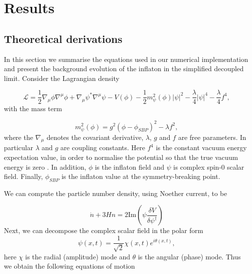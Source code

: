 \section{Results}

\subsection{Theoretical derivations}
In this section we summarise the equations used in our numerical implementation and present the background evolution of the inflaton in the simplified decoupled limit. Consider the Lagrangian density \cite{Apostolos}

\begin{equation}
    \mathcal{L} = \frac{1}{2} \nabla_{\mu} \phi \nabla^{\mu} \phi + \nabla_{\mu} \psi^* \nabla^{\mu} \psi - V(\phi) - \frac{1}{2} m_{\psi}^2(\phi) |\psi|^2 - \frac{\lambda}{4} |\psi|^4 - \frac{\lambda}{4}f^4,
\end{equation}
with the mass term

\begin{equation}
    m_{\psi}^2(\phi) = g^2 (\phi - \phi_{SBP})^2 - \lambda f^2,
\end{equation}
where the $\nabla_{\mu}$ denotes the covariant derivative, $\lambda$, $g$ and $f$ are free parameters. In particular $\lambda$ and $g$ are coupling constants. Here $f^4$ is the constant vacuum energy expectation value, in order to normalise the potential so that the true vacuum energy is zero \cite{dimopoulos2019quintessential}. In addition, $\phi$ is the inflaton field and $\psi$ is complex spin-0 scalar field. Finally, $\phi_{SBP}$ is the inflaton value at the symmetry-breaking point. 




We can compute the particle number density, using Noether current, to be

\begin{equation}
    \dot{n} + 3H n = 2 \mathrm{Im} \left( \psi \frac{\delta V}{\delta \psi^{\dag}} \right)
\end{equation}
Next, we can decompose the complex scalar field in the polar form
\begin{equation}
    \psi(x,t) = \frac{1}{\sqrt{2}} \chi(x,t) e^{i \theta(x,t)},
\end{equation}
here $\chi$ is the radial (amplitude) mode and $\theta$ is the angular (phase) mode. Thus we obtain the following equations of motion

